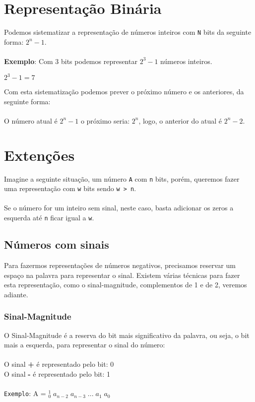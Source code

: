 \documentclass[12pt, onecolumn]{article}
\begin{document}
		\section{Representação Binária}
	
	Podemos sistematizar a representação de números inteiros com \texttt{N} bits
	da seguinte forma: $2^{n} - 1$. \\
	\\
	\textbf{Exemplo}: Com 3 bits podemos representar $2^{3} - 1$ números inteiros.
			\begin{center} 
				$2^{3} - 1 = 7$ \\
			\end{center}
	Com esta sistematização podemos prever o próximo número e os anteriores, 
	da seguinte forma: \\
	\\
	O número atual é $2^{n} - 1$ o próximo seria: $2^{n}$, logo, o anterior
	do atual é $2^{n} - 2$.

		\section{\centering Extenções}
	
	Imagine a seguinte situação, um número \texttt{A} com \texttt{n} bits, porém,
	queremos fazer uma representação com \texttt{w} bits sendo \texttt{w > n}.\\
	\\
	Se o número for um inteiro sem sinal, neste caso, basta adicionar os zeros
	a esquerda até \texttt{n} ficar igual a \texttt{w}.
	
		\subsection{\centering Números com sinais}
	
	Para fazermos representações de números negativos, precisamos reservar um espaço
	na palavra para representar o sinal. Existem várias técnicas para fazer esta 
	representação, como o sinal-magnitude, complementos de 1 e de 2, veremos
	adiante.

		\subsubsection{\centering Sinal-Magnitude}
	
	O Sinal-Magnitude é a reserva do bit mais significativo da palavra, ou seja, 
	o bit mais a esquerda, para representar o sinal do número: \\
	\\
	O sinal \textbf{+} é representado pelo bit: 0\\
	O sinal \textbf{-} é representado pelo bit: 1\\
	\\
	\texttt{Exemplo}: A = ${_0^1}\;a_{n-2}\;a_{n-3}\;...\;a_1\;a_0$
	
\end{document}
